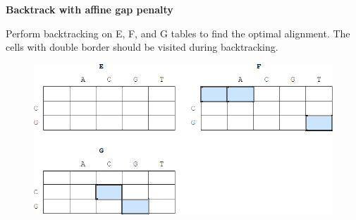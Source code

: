 \question \textbf{Backtrack with affine gap penalty}
  
Perform backtracking on E, F, and G tables to find the optimal alignment. The cells with double border should be visited during backtracking. 

\medskip 

\begin{figure}[h]
  \centering
      \includegraphics[width=0.75 \textwidth]{fig03/affine_dp_backtrack.png}
\end{figure}

\vspace{0.1 in}


\newpage
